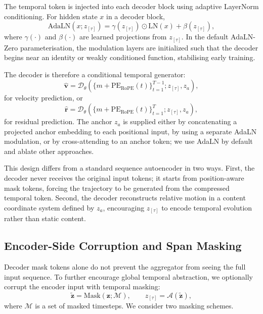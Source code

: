 \documentclass{article}
\newcommand{\zseq}{\mathbf{z}}          %
\newcommand{\ztau}{z_{[\tau]}}          %
\newcommand{\agg}{\mathcal{A}}          %
\newcommand{\dec}{\mathcal{D}}          %
\newcommand{\vseq}{\mathbf{v}}          %
\newcommand{\rseq}{\mathbf{r}}          %
\newcommand{\za}{z_a}                   %
\newcommand{\pe}{\mathrm{PE}}
\newcommand{\adain}{\mathrm{AdaLN}}
\begin{document}
The temporal token is injected into each decoder block using
adaptive LayerNorm conditioning.  For hidden state $x$ in a decoder
block,
%
\begin{equation}
  \adain(x;\ztau)
  =
  \gamma(\ztau) \odot \mathrm{LN}(x)
  +
  \beta(\ztau),
  \label{eq:adaln}
\end{equation}
%
where $\gamma(\cdot)$ and $\beta(\cdot)$ are learned projections
from $\ztau$.  In the default AdaLN-Zero parameterisation, the
modulation layers are initialized such that the decoder begins near
an identity or weakly conditioned function, stabilising early
training.

The decoder is therefore a conditional temporal generator:
%
\begin{equation}
  \hat{\vseq}
  =
  \dec_\theta
  \left(
    \{m+\pe_{\mathrm{RoPE}}(t)\}_{t=1}^{T-1};
    \ztau,\za
  \right),
  \label{eq:decoder_velocity}
\end{equation}
%
for velocity prediction, or
%
\begin{equation}
  \hat{\rseq}
  =
  \dec_\theta
  \left(
    \{m+\pe_{\mathrm{RoPE}}(t)\}_{t=1}^{T};
    \ztau,\za
  \right),
  \label{eq:decoder_residual}
\end{equation}
%
for residual prediction.  The anchor $\za$ is supplied either by
concatenating a projected anchor embedding to each positional input, by
using a separate AdaLN modulation, or by cross-attending to an
anchor token; we use AdaLN by default and ablate other approaches.

This design differs from a standard sequence autoencoder in two
ways.  First, the decoder never receives the original input tokens;
it starts from position-aware mask tokens, forcing the trajectory to
be generated from the compressed temporal token.  Second, the
decoder reconstructs relative motion in a content coordinate system
defined by $\za$, encouraging $\ztau$ to encode temporal evolution
rather than static content.

\subsection{Encoder-Side Corruption and Span Masking}
\label{ssec:spanmask}

Decoder mask tokens alone do not prevent the aggregator from seeing
the full input sequence.  To further encourage global temporal
abstraction, we optionally corrupt the encoder input with temporal
masking:
%
\begin{equation}
  \tilde{\zseq}
  =
  \mathrm{Mask}(\zseq;\mathcal{M}),
  \qquad
  \ztau = \agg(\tilde{\zseq}),
  \label{eq:encoder_masking}
\end{equation}
%
where $\mathcal{M}$ is a set of masked timesteps.  We consider two
masking schemes.
\end{document}
